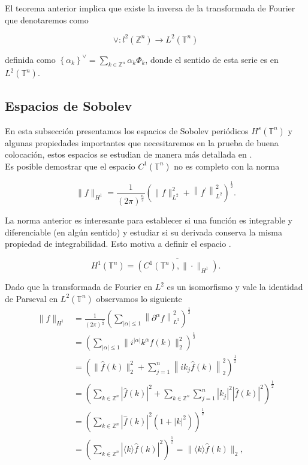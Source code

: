 \documentclass[12pt]{article}
\newcommand\Z{\ensuremath{\mathbb{Z}}}
\newcommand\T{\mathbb{T}}
\renewcommand{\hat}{\widehat}
\begin{document}
El teorema anterior implica que existe la inversa de la transformada de Fourier que denotaremos como

$$
\vee: l^2\left(\mathbb{Z}^n\right) \rightarrow L^2\left(\mathbb{T}^n\right)
$$

definida como $\left\{\alpha_k\right\}^{\vee}=\displaystyle\sum_{k \in \mathbb{Z}^n} \alpha_k \Phi_k$, donde el sentido de esta serie es en $L^2(\T^n)$.


\subsection{Espacios de Sobolev}

En esta subsección presentamos los espacios de Sobolev periódicos $H^s(\T^n)$ y algunas propiedades importantes que necesitaremos en la prueba de buena colocación, estos espacios se estudian de manera más detallada  en \cite{ioriojunior2001equacoes}.\\

Es posible demostrar que el espacio $C^1(\T^n)$ no es completo con la norma

$$
\|f\|_{H^1}=\frac{1}{(2 \pi)^{\frac{n}{2}}}\left(\|f\|_{L^2}^2+\left\|f^{\prime}\right\|_{L^2}^2\right)^{\frac{1}{2}}.
$$


La norma anterior es interesante para establecer si una función es integrable y diferenciable (en algún sentido) y estudiar si su derivada conserva la misma propiedad de integrabilidad. Esto motiva a definir el espacio \cite{ogrianoc}.

$$
H^1(\T^n)=\overline{\left(C^1(\T^n),\|\cdot\|_{H^1}\right)}.
$$

Dado que la transformada de Fourier en $L^2$ es un isomorfismo y vale la identidad de Parseval en $L^2(\T^n)$ observamos lo siguiente\\


$$
\begin{aligned}
 \|f\|_{H^{1}}&=\frac{1}{(2 \pi)^{\frac{n}{2}}}\left(\sum_{|\alpha|\leq1}\left\|\partial^\alpha f\right\|_{L^2}^2\right)^{\frac{1}{2}} \\
& =\left(\sum_{|\alpha| \leq 1}\| i^{|\alpha|}k^{\alpha} \hat{f}(k) \|_2^2\right)^{\frac{1}{2}} \\
& =\left(\|\widehat{f}(k)\|_2^2+\sum_{j=1}^n\left\|i k_j \hat{f}(k)\right\|_2^2\right)^{\frac{1}{2}} \\
& =\left(\sum_{k \in \Z^n}|\hat{f}(k)|^2+\sum_{k \in \Z^n} \sum_{j=1}^n\left|k_j\right|^2|\hat{f}(k)|^2\right)^{\frac{1}{2}} \\
& =\left(\sum_{k \in \Z^n}|\hat{f}(k)|^2\left(1+|k|^2\right)\right)^{\frac{1}{2}}\\
&=\left(\sum_{k\in\Z^{n}} |\langle k \rangle \hat{f}(k)|^2\right)^{\frac{1}{2}}=\|\langle k\rangle\hat{f}(k)\|_2,
\end{aligned}
$$
\end{document}
